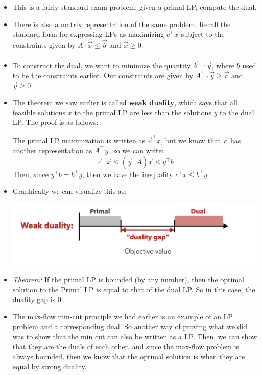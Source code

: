 \begin{itemize}
	\item This is a fairly standard exam problem: given a primal LP, compute the dual.   
	\item There is also a matrix representation of the same problem. Recall the standard form for expressing
		LPs as maximizing \(c^\top \vec x\) subject to the constraints given by 
		\(A \cdot \vec x \le \vec b\) and \(\vec x \ge 0\). 
	\item To construct the dual, we want to minimize 
		the quantity \(\vec b^\top \cdot \vec y\), where \(b\) used to be the constraints earlier. Our 
		constraints are given by \(A^\top \cdot \vec y \ge \vec c\) and \(\vec y \ge 0\)
	\item The theorem we saw earlier is called \textbf{weak duality}, which says that all feasible 
		solutions \(x\) to the primal LP are less than the solutions \(y\) to the dual LP. The proof 
		is as follows:

		The primal LP maximization is written as \(\vec c^\top x\), but we know that \(\vec c\) has another 
		representation as \(A^\top \vec y\), so we can write: 
		\[
		\vec c^\top \vec x \le (\vec y^\top A )\vec x \le y^\top b
		\] 
		Then, since \(y^\top b = b^\top y\), then we have the inequality \(c^\top x \le b^\top y\). 
	\item Graphically we can visualize this as:
		\begin{center}
			\includegraphics[scale=0.7]{LP-duality-gap.png}
		\end{center}
	\item \textit{Theorem:} If the primal LP is bounded (by any number), 
		then the optimal solution to the 
		Primal LP is equal to that of the dual LP. So in this case, the duality gap is 0 

	\item The max-flow min-cut principle we had earlier is an example of an LP problem and a corresponding
		dual. So another way of proving what we did was to show that the min cut can also be written as a 
		LP. Then, we can show that they are the duals of each other, and since the max-flow problem is 
		always bounded, then we know that the optimal solution is when they are equal by strong duality. 
\end{itemize}
